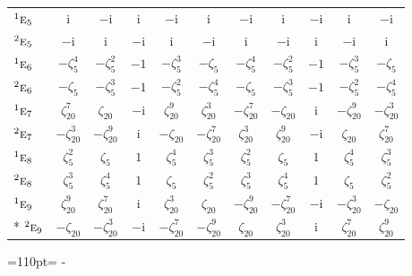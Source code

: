 \documentclass[10pt,a4paper]{article}
\newcommand{\needspace}[1]{\par\penalty-100\begingroup\dimen0=#1\relax\dimen2=\pagegoal
  \advance\dimen2-\pagetotal\ifdim\dimen0>\dimen2\relax\ifdim\dimen2>0pt\vfil\break\fi\fi
  \endgroup}
\numberwithin{equation}{section}
\newcommand{\irr}[1]{\text{\normalfont\scshape #1}}
\newcommand{\conjpair}[1]{{}^{#1}}
\newcommand{\iunit}{\mathrm{i}}
\newcommand{\rootunity}[1]{\zeta_{#1}}
\begin{document}
{\begin{longtable}{@{}lcccccccccc@{}}
$\conjpair{1}\irr{e}_{5}$ & $\iunit{}$ & $-\iunit{}$ & $\iunit{}$ & $-\iunit{}$ & $\iunit{}$ & $-\iunit{}$ & $\iunit{}$ & $-\iunit{}$ & $\iunit{}$ & $-\iunit{}$\\
$\conjpair{2}\irr{e}_{5}$ & $-\iunit{}$ & $\iunit{}$ & $-\iunit{}$ & $\iunit{}$ & $-\iunit{}$ & $\iunit{}$ & $-\iunit{}$ & $\iunit{}$ & $-\iunit{}$ & $\iunit{}$\\
$\conjpair{1}\irr{e}_{6}$ & $-\rootunity{5}^{4}$ & $-\rootunity{5}^{2}$ & $-1$ & $-\rootunity{5}^{3}$ & $-\rootunity{5}$ & $-\rootunity{5}^{4}$ & $-\rootunity{5}^{2}$ & $-1$ & $-\rootunity{5}^{3}$ & $-\rootunity{5}$\\
$\conjpair{2}\irr{e}_{6}$ & $-\rootunity{5}$ & $-\rootunity{5}^{3}$ & $-1$ & $-\rootunity{5}^{2}$ & $-\rootunity{5}^{4}$ & $-\rootunity{5}$ & $-\rootunity{5}^{3}$ & $-1$ & $-\rootunity{5}^{2}$ & $-\rootunity{5}^{4}$\\
$\conjpair{1}\irr{e}_{7}$ & $\rootunity{20}^{7}$ & $\rootunity{20}$ & $-\iunit{}$ & $\rootunity{20}^{9}$ & $\rootunity{20}^{3}$ & $-\rootunity{20}^{7}$ & $-\rootunity{20}$ & $\iunit{}$ & $-\rootunity{20}^{9}$ & $-\rootunity{20}^{3}$\\
$\conjpair{2}\irr{e}_{7}$ & $-\rootunity{20}^{3}$ & $-\rootunity{20}^{9}$ & $\iunit{}$ & $-\rootunity{20}$ & $-\rootunity{20}^{7}$ & $\rootunity{20}^{3}$ & $\rootunity{20}^{9}$ & $-\iunit{}$ & $\rootunity{20}$ & $\rootunity{20}^{7}$\\
$\conjpair{1}\irr{e}_{8}$ & $\rootunity{5}^{2}$ & $\rootunity{5}$ & $1$ & $\rootunity{5}^{4}$ & $\rootunity{5}^{3}$ & $\rootunity{5}^{2}$ & $\rootunity{5}$ & $1$ & $\rootunity{5}^{4}$ & $\rootunity{5}^{3}$\\
$\conjpair{2}\irr{e}_{8}$ & $\rootunity{5}^{3}$ & $\rootunity{5}^{4}$ & $1$ & $\rootunity{5}$ & $\rootunity{5}^{2}$ & $\rootunity{5}^{3}$ & $\rootunity{5}^{4}$ & $1$ & $\rootunity{5}$ & $\rootunity{5}^{2}$\\
$\conjpair{1}\irr{e}_{9}$ & $\rootunity{20}^{9}$ & $\rootunity{20}^{7}$ & $\iunit{}$ & $\rootunity{20}^{3}$ & $\rootunity{20}$ & $-\rootunity{20}^{9}$ & $-\rootunity{20}^{7}$ & $-\iunit{}$ & $-\rootunity{20}^{3}$ & $-\rootunity{20}$\\*
$\conjpair{2}\irr{e}_{9}$ & $-\rootunity{20}$ & $-\rootunity{20}^{3}$ & $-\iunit{}$ & $-\rootunity{20}^{7}$ & $-\rootunity{20}^{9}$ & $\rootunity{20}$ & $\rootunity{20}^{3}$ & $\iunit{}$ & $\rootunity{20}^{7}$ & $\rootunity{20}^{9}$\\
\bottomrule\end{longtable}}
\needspace{110pt}
\end{document}
